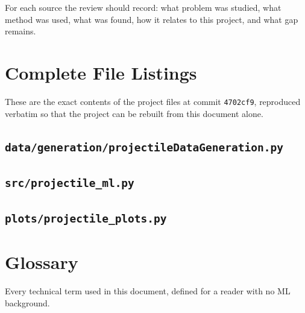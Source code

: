 \documentclass[11pt,a4paper]{article}
\begin{document}
For each source the review should record: what problem was studied, what method was used, what was
found, how it relates to this project, and what gap remains.

\appendix
\section{Complete File Listings}\label{app:listings}

These are the exact contents of the project files at commit \texttt{4702cf9}, reproduced verbatim so
that the project can be rebuilt from this document alone.

\subsection{\texttt{data/generation/projectileDataGeneration.py}}


\subsection{\texttt{src/projectile\_ml.py}}


\subsection{\texttt{plots/projectile\_plots.py}}


\section{Glossary}\label{app:glossary}

Every technical term used in this document, defined for a reader with no ML background.
\end{document}
